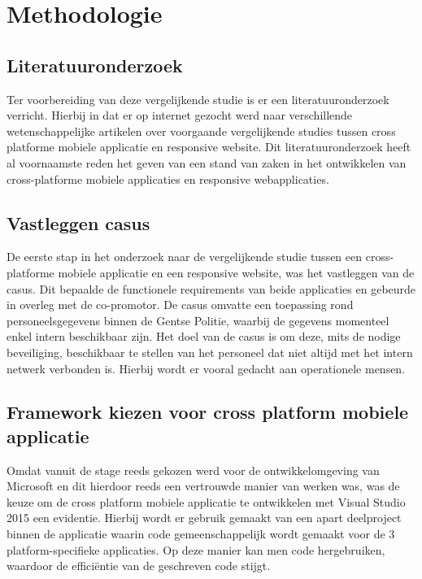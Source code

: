 
\chapter{Methodologie}
\label{ch:methodologie}


\section{Literatuuronderzoek}
Ter voorbereiding van deze vergelijkende studie is er een literatuuronderzoek verricht.
Hierbij in dat er op internet gezocht werd naar verschillende wetenschappelijke artikelen over voorgaande vergelijkende studies
tussen cross platforme mobiele applicatie en responsive website. Dit literatuuronderzoek heeft al voornaamste reden het geven van
een stand van zaken in het ontwikkelen van cross-platforme mobiele applicaties en responsive webapplicaties.

\section{Vastleggen casus}
De eerste stap in het onderzoek naar de vergelijkende studie tussen een cross-platforme mobiele applicatie en een
responsive website, was het vastleggen van de casus. Dit bepaalde de functionele requirements van beide applicaties en
gebeurde in overleg met de co-promotor. De casus omvatte een toepassing rond personeelsgegevens binnen de Gentse Politie,
waarbij de gegevens momenteel enkel intern beschikbaar zijn. Het doel van de casus is om deze, mits de nodige beveiliging, beschikbaar
te stellen van het personeel dat niet altijd met het intern netwerk verbonden is. Hierbij wordt er vooral gedacht aan operationele mensen.

\section{Framework kiezen voor cross platform mobiele applicatie}
Omdat vanuit de stage reeds gekozen werd voor de ontwikkelomgeving van Microsoft en dit hierdoor reeds een vertrouwde
manier van werken was, was de keuze om de cross platform mobiele applicatie te ontwikkelen met Visual Studio 2015 een evidentie.
Hierbij wordt er gebruik gemaakt van een apart deelproject binnen de applicatie waarin code gemeenschappelijk wordt gemaakt voor
de 3 platform-specifieke applicaties. Op deze manier kan men code hergebruiken, waardoor de efficiëntie van de geschreven code stijgt.

